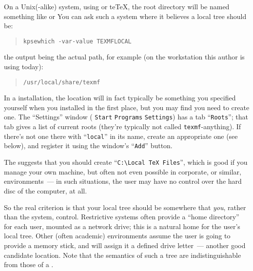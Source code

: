 On a Unix(-alike) system, using \texlive{} or te\TeX{}, the root
directory will be named something like 
or 
You can ask such a system where it believes a local tree should be:
\begin{quote} 
\begin{verbatim}
kpsewhich -var-value TEXMFLOCAL
\end{verbatim}
\end{quote}
the output being the actual path, for example (on the workstation this
author is using today):
\begin{quote}
\begin{verbatim}
/usr/local/share/texmf
\end{verbatim}
\end{quote}

In a \miktex{} installation, the location will in fact typically be
something you specified yourself when you installed \miktex{} in the
first place, but you may find you need to create one.  The \miktex{}
``Settings'' window (%
  \texttt{Start}\arrowhyph{}%
  \texttt{Programs}\arrowhyph{}%
  \texttt{\miktex{}}\arrowhyph{}%
  \texttt{Settings})
has a tab ``\texttt{Roots}''; that tab gives a list of current
 roots (they're typically not called
\texttt{texmf}-anything).  If there's not one there with
``\texttt{local}'' in its name, create an appropriate one (see below),
and register it using the window's
``\texttt{Add}'' button.

The %
\href{http://docs.miktex.org/faq/maintenance.html}{\miktex{} }
suggests that you should create %
``\texttt{C:\textbackslash Local TeX Files}'', which is good if you
manage your own machine, but often not even possible in corporate, or
similar, environments~--- in such situations, the user may have no
control over the hard disc of the computer, at all.

So the real criterion is that your local tree should be somewhere that
\emph{you}, rather than the system, control.  Restrictive systems often
provide a ``home directory'' for each user, mounted as a network
drive; this is a natural home for the user's local tree.  Other (often
academic) environments assume the user is going to provide a memory
stick, and will assign it a defined drive letter~--- another good
candidate location.  Note that the semantics of such a tree are
indistinguishable from those of a %
.

